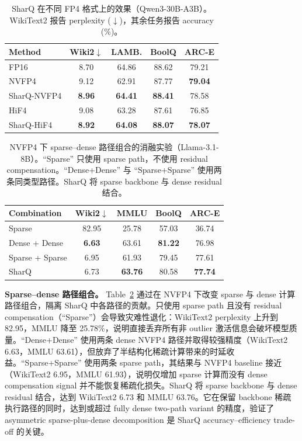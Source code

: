 \documentclass{article}
\begin{document}
\begin{table}[t]
\caption{SharQ 在不同 FP4 格式上的效果（Qwen3-30B-A3B）。WikiText2 报告 perplexity ($\downarrow$)，其余任务报告 accuracy (\%)。}
\label{tab:ablation-format}
\centering
\small
\begin{tabular}{@{}l|cccc@{}}
\toprule
Method & Wiki2$\downarrow$ & LAMB. & BoolQ & ARC-E \\
\midrule
FP16       & 8.70 & 64.86 & 88.62 & 79.21 \\
\midrule
NVFP4      & 9.12 & 62.91 & 87.77 & \textbf{79.04} \\
SharQ-NVFP4 & \textbf{8.96} & \textbf{64.41} & \textbf{88.41} & 78.58 \\
\midrule
HiF4       & 9.08 & 63.28 & 87.61 & 76.85 \\
SharQ-HiF4 & \textbf{8.92} & \textbf{64.08} & \textbf{88.07} & \textbf{78.07} \\
\bottomrule
\end{tabular}
\end{table}

\begin{table}[t]
\caption{NVFP4 下 sparse--dense 路径组合的消融实验（Llama-3.1-8B）。``Sparse'' 只使用 sparse path，不使用 residual
compensation。``Dense+Dense'' 与 ``Sparse+Sparse'' 使用两条同类型路径。SharQ 将 sparse backbone 与 dense residual 结合。}
\label{tab:ablation-combination}
\centering
\small
\begin{tabular}{@{}l|cccc@{}}
\toprule
Combination & Wiki2$\downarrow$ & MMLU & BoolQ & ARC-E \\
\midrule
Sparse          & 82.95 & 25.78 & 57.03 & 36.74 \\
Dense + Dense   &  \textbf{6.63} & 63.61 & \textbf{81.22} & 76.98 \\
Sparse + Sparse &  6.95 & 61.93 & 79.45 & 77.61 \\
SharQ           &  6.73 & \textbf{63.76} & 80.58 & \textbf{77.74} \\
\bottomrule
\end{tabular}
\end{table}

\textbf{Sparse--dense 路径组合。}
Table~\ref{tab:ablation-combination} 通过在 NVFP4 下改变 sparse 与 dense 计算路径组合，隔离 SharQ
中各路径的贡献。只使用 sparse path 且没有 residual compensation（``Sparse''）会导致灾难性退化：WikiText2
perplexity 上升到 82.95，MMLU 降至 25.78\%，说明直接丢弃所有非 outlier 激活信息会破坏模型质量。``Dense+Dense''
使用两条 dense NVFP4 路径并取得较强精度（WikiText2 6.63，MMLU 63.61），但放弃了半结构化稀疏计算带来的时延收益。``Sparse+Sparse''
使用两条 sparse path，其结果与 NVFP4 baseline 接近（WikiText2 6.95，MMLU 61.93），说明仅增加 sparse
计算而没有 dense compensation signal 并不能恢复稀疏化损失。SharQ 将 sparse backbone 与 dense residual
结合，达到 WikiText2 6.73 和 MMLU 63.76。它在保留 backbone 稀疏执行路径的同时，达到或超过 fully dense two-path
variant 的精度，验证了 asymmetric sparse-plus-dense decomposition 是 SharQ accuracy--efficiency trade-off 的关键。
\end{document}
